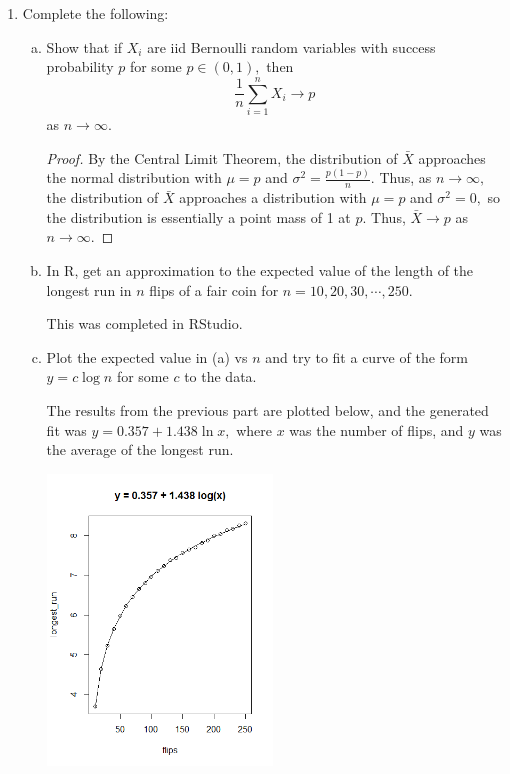 \documentclass{article}
\begin{document}
\begin{enumerate}
	\item Complete the following:
		\begin{enumerate}[(a)]
			\item Show that if $X_i$ are iid Bernoulli random variables with success probability $p$ for some $p\in(0, 1),$ then \[\frac{1}{n}\sum_{i=1}^n X_i\to p\] as $n\to\infty.$
				\begin{proof}
					By the Central Limit Theorem, the distribution of $\bar{X}$ approaches the normal distribution with $\mu=p$ and $\sigma^2=\frac{p(1-p)}{n}.$ Thus, as $n\to\infty,$ the distribution of $\bar{X}$ approaches a distribution with $\mu=p$ and $\sigma^2=0,$ so the distribution is essentially a point mass of 1 at $p.$ Thus, $\bar{X}\to p$ as $n\to\infty.$
					
				\end{proof}

			\item In R, get an approximation to the expected value of the length of the longest run in $n$ flips of a fair coin for $n=10, 20, 30, \cdots, 250.$
				\begin{answer*}
					This was completed in RStudio. 
				\end{answer*}

			\item Plot the expected value in (a) vs $n$ and try to fit a curve of the form $y=c\log n$ for some $c$ to the data.
				\begin{soln}
					The results from the previous part are plotted below, and the generated fit was $y=0.357 + 1.438\ln x,$ where $x$ was the number of flips, and $y$ was the average of the longest run.
					\begin{center}
						\includegraphics[width=6cm]{longest_run.png}
					\end{center}
					

\end{soln}
\end{enumerate}
\end{enumerate}
\end{document}
